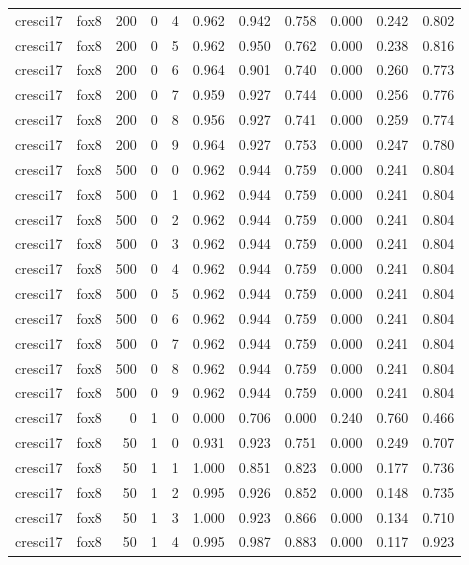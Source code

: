 \begin{tabular}{llrrrrrrrrr}
cresci17 & fox8 & 200 & 0 & 4 & 0.962 & 0.942 & 0.758 & 0.000 & 0.242 & 0.802 \\
cresci17 & fox8 & 200 & 0 & 5 & 0.962 & 0.950 & 0.762 & 0.000 & 0.238 & 0.816 \\
cresci17 & fox8 & 200 & 0 & 6 & 0.964 & 0.901 & 0.740 & 0.000 & 0.260 & 0.773 \\
cresci17 & fox8 & 200 & 0 & 7 & 0.959 & 0.927 & 0.744 & 0.000 & 0.256 & 0.776 \\
cresci17 & fox8 & 200 & 0 & 8 & 0.956 & 0.927 & 0.741 & 0.000 & 0.259 & 0.774 \\
cresci17 & fox8 & 200 & 0 & 9 & 0.964 & 0.927 & 0.753 & 0.000 & 0.247 & 0.780 \\
cresci17 & fox8 & 500 & 0 & 0 & 0.962 & 0.944 & 0.759 & 0.000 & 0.241 & 0.804 \\
cresci17 & fox8 & 500 & 0 & 1 & 0.962 & 0.944 & 0.759 & 0.000 & 0.241 & 0.804 \\
cresci17 & fox8 & 500 & 0 & 2 & 0.962 & 0.944 & 0.759 & 0.000 & 0.241 & 0.804 \\
cresci17 & fox8 & 500 & 0 & 3 & 0.962 & 0.944 & 0.759 & 0.000 & 0.241 & 0.804 \\
cresci17 & fox8 & 500 & 0 & 4 & 0.962 & 0.944 & 0.759 & 0.000 & 0.241 & 0.804 \\
cresci17 & fox8 & 500 & 0 & 5 & 0.962 & 0.944 & 0.759 & 0.000 & 0.241 & 0.804 \\
cresci17 & fox8 & 500 & 0 & 6 & 0.962 & 0.944 & 0.759 & 0.000 & 0.241 & 0.804 \\
cresci17 & fox8 & 500 & 0 & 7 & 0.962 & 0.944 & 0.759 & 0.000 & 0.241 & 0.804 \\
cresci17 & fox8 & 500 & 0 & 8 & 0.962 & 0.944 & 0.759 & 0.000 & 0.241 & 0.804 \\
cresci17 & fox8 & 500 & 0 & 9 & 0.962 & 0.944 & 0.759 & 0.000 & 0.241 & 0.804 \\
cresci17 & fox8 & 0 & 1 & 0 & 0.000 & 0.706 & 0.000 & 0.240 & 0.760 & 0.466 \\
cresci17 & fox8 & 50 & 1 & 0 & 0.931 & 0.923 & 0.751 & 0.000 & 0.249 & 0.707 \\
cresci17 & fox8 & 50 & 1 & 1 & 1.000 & 0.851 & 0.823 & 0.000 & 0.177 & 0.736 \\
cresci17 & fox8 & 50 & 1 & 2 & 0.995 & 0.926 & 0.852 & 0.000 & 0.148 & 0.735 \\
cresci17 & fox8 & 50 & 1 & 3 & 1.000 & 0.923 & 0.866 & 0.000 & 0.134 & 0.710 \\
cresci17 & fox8 & 50 & 1 & 4 & 0.995 & 0.987 & 0.883 & 0.000 & 0.117 & 0.923 \\

\end{tabular}
